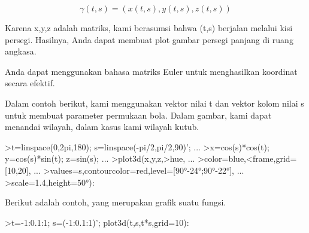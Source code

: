 \documentclass[a4paper,10pt]{article}
\begin{document}
\begin{eulernotebook}
\begin{eulercomment}
\begin{eulercomment}
\begin{eulercomment}
\begin{eulercomment}
\begin{eulercomment}
\begin{eulercomment}
\begin{eulercomment}
\begin{eulercomment}
\begin{eulercomment}
\begin{eulercomment}
\begin{eulercomment}
\begin{eulercomment}
\begin{eulercomment}
\begin{eulercomment}
\begin{eulercomment}
\begin{eulercomment}
\begin{eulercomment}
\begin{eulercomment}
\begin{eulercomment}
\begin{eulercomment}
\begin{eulercomment}
\begin{eulercomment}
\begin{eulercomment}
\begin{eulercomment}
\begin{eulercomment}
\begin{eulercomment}
\begin{eulercomment}
\begin{eulercomment}
\begin{eulercomment}
\begin{eulercomment}
\begin{eulercomment}
\begin{eulercomment}
\begin{eulercomment}
\begin{eulercomment}
\begin{eulercomment}
\begin{eulercomment}
\begin{eulercomment}
\begin{eulercomment}
\begin{eulercomment}
\begin{eulercomment}
\begin{eulercomment}
\end{eulercomment}
\begin{eulerformula}
\[
\gamma(t,s) = (x(t,s),y(t,s),z(t,s))
\]
\end{eulerformula}
\begin{eulercomment}
Karena x,y,z adalah matriks, kami berasumsi bahwa (t,s) berjalan
melalui kisi persegi. Hasilnya, Anda dapat membuat plot gambar persegi
panjang di ruang angkasa.

Anda dapat menggunakan bahasa matriks Euler untuk menghasilkan
koordinat secara efektif.

Dalam contoh berikut, kami menggunakan vektor nilai t dan vektor kolom
nilai s untuk membuat parameter permukaan bola. Dalam gambar, kami
dapat menandai wilayah, dalam kasus kami wilayah kutub.
\end{eulercomment}
\begin{eulerprompt}
>t=linspace(0,2pi,180); s=linspace(-pi/2,pi/2,90)'; ...
>x=cos(s)*cos(t); y=cos(s)*sin(t); z=sin(s); ...
>plot3d(x,y,z,>hue, ...
>color=blue,<frame,grid=[10,20], ...
>values=s,contourcolor=red,level=[90°-24°;90°-22°], ...
>scale=1.4,height=50°):
\end{eulerprompt}
\begin{eulercomment}
Berikut adalah contoh, yang merupakan grafik suatu fungsi.
\end{eulercomment}
\begin{eulerprompt}
>t=-1:0.1:1; s=(-1:0.1:1)'; plot3d(t,s,t*s,grid=10):
\end{eulerprompt}

\end{eulercomment}
\end{eulercomment}
\end{eulercomment}
\end{eulercomment}
\end{eulercomment}
\end{eulercomment}
\end{eulercomment}
\end{eulercomment}
\end{eulercomment}
\end{eulercomment}
\end{eulercomment}
\end{eulercomment}
\end{eulercomment}
\end{eulercomment}
\end{eulercomment}
\end{eulercomment}
\end{eulercomment}
\end{eulercomment}
\end{eulercomment}
\end{eulercomment}
\end{eulercomment}
\end{eulercomment}
\end{eulercomment}
\end{eulercomment}
\end{eulercomment}
\end{eulercomment}
\end{eulercomment}
\end{eulercomment}
\end{eulercomment}
\end{eulercomment}
\end{eulercomment}
\end{eulercomment}
\end{eulercomment}
\end{eulercomment}
\end{eulercomment}
\end{eulercomment}
\end{eulercomment}
\end{eulercomment}
\end{eulercomment}
\end{eulercomment}
\end{eulernotebook}
\end{document}
